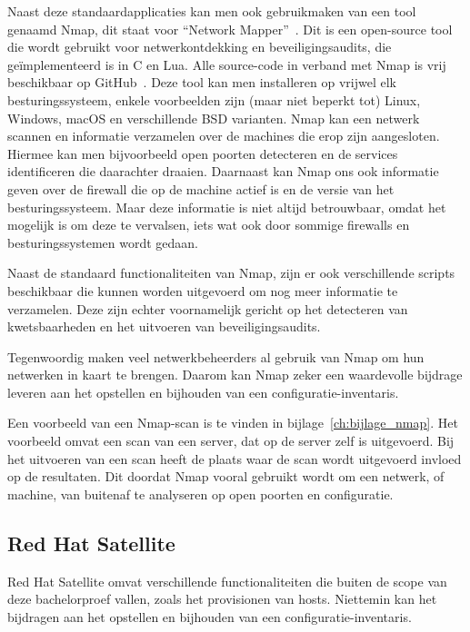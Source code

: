 Naast deze standaardapplicaties kan men ook gebruikmaken van een tool genaamd Nmap, dit staat voor ``Network Mapper''~\autocite{nmap-website}.
Dit is een open-source tool die wordt gebruikt voor netwerkontdekking en beveiligingsaudits, die ge\"implementeerd is in C en Lua.
Alle source-code in verband met Nmap is vrij beschikbaar op GitHub~\autocite{nmap-github}.
Deze tool kan men installeren op vrijwel elk besturingssysteem, enkele voorbeelden zijn (maar niet beperkt tot) Linux, Windows, macOS en verschillende BSD varianten.
Nmap kan een netwerk scannen en informatie verzamelen over de machines die erop zijn aangesloten.
Hiermee kan men bijvoorbeeld open poorten detecteren en de services identificeren die daarachter draaien.
Daarnaast kan Nmap ons ook informatie geven over de firewall die op de machine actief is en de versie van het besturingssysteem.
Maar deze informatie is niet altijd betrouwbaar, omdat het mogelijk is om deze te vervalsen, iets wat ook door sommige firewalls en besturingssystemen wordt gedaan.

Naast de standaard functionaliteiten van Nmap, zijn er ook verschillende scripts beschikbaar die kunnen worden uitgevoerd om nog meer informatie te verzamelen.
Deze zijn echter voornamelijk gericht op het detecteren van kwetsbaarheden en het uitvoeren van beveiligingsaudits.

Tegenwoordig maken veel netwerkbeheerders al gebruik van Nmap om hun netwerken in kaart te brengen.
Daarom kan Nmap zeker een waardevolle bijdrage leveren aan het opstellen en bijhouden van een configuratie-inventaris.

Een voorbeeld van een Nmap-scan is te vinden in bijlage~\ref{ch:bijlage_nmap}.
Het voorbeeld omvat een scan van een server, dat op de server zelf is uitgevoerd.
Bij het uitvoeren van een scan heeft de plaats waar de scan wordt uitgevoerd invloed op de resultaten.
Dit doordat Nmap vooral gebruikt wordt om een netwerk, of machine, van buitenaf te analyseren op open poorten en configuratie.

\subsection{Red Hat Satellite}
\label{sub:red-hat-satellite}

Red Hat Satellite omvat verschillende functionaliteiten die buiten de scope van deze bachelorproef vallen, zoals het provisionen van hosts.
Niettemin kan het bijdragen aan het opstellen en bijhouden van een configuratie-inventaris.

